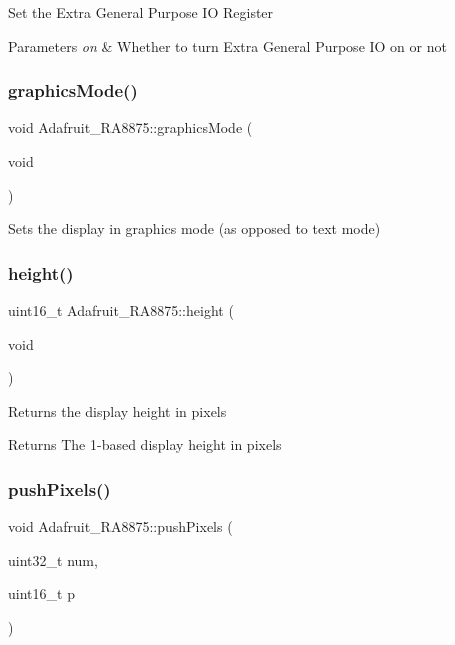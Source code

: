 Set the Extra General Purpose IO Register


\begin{DoxyParams}{Parameters}
{\em on} & Whether to turn Extra General Purpose IO on or not \\
\hline
\end{DoxyParams}
\mbox{\label{class_adafruit___r_a8875_a214eb74511139c5a0cdb62b051655f8a}} 
\subsubsection{\texorpdfstring{graphicsMode()}{graphicsMode()}}
{\footnotesize\ttfamily void Adafruit\+\_\+\+R\+A8875\+::graphics\+Mode (\begin{DoxyParamCaption}\item[{void}]{ }\end{DoxyParamCaption})}

Sets the display in graphics mode (as opposed to text mode) \mbox{\label{class_adafruit___r_a8875_a9f694201aec288b75ace7751b5a9f458}} 
\subsubsection{\texorpdfstring{height()}{height()}}
{\footnotesize\ttfamily uint16\+\_\+t Adafruit\+\_\+\+R\+A8875\+::height (\begin{DoxyParamCaption}\item[{void}]{ }\end{DoxyParamCaption})}

Returns the display height in pixels

\begin{DoxyReturn}{Returns}
The 1-\/based display height in pixels 
\end{DoxyReturn}
\mbox{\label{class_adafruit___r_a8875_a56ee5cb7ee6909234b33d43d6ccad151}} 
\subsubsection{\texorpdfstring{pushPixels()}{pushPixels()}}
{\footnotesize\ttfamily void Adafruit\+\_\+\+R\+A8875\+::push\+Pixels (\begin{DoxyParamCaption}\item[{uint32\+\_\+t}]{num,  }\item[{uint16\+\_\+t}]{p }\end{DoxyParamCaption})}

